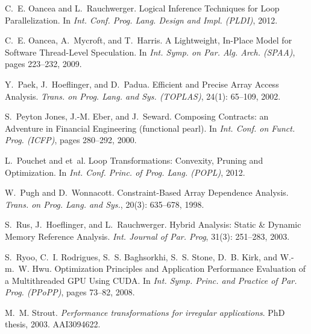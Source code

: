 \documentclass{sigplanconf}  %
\begin{document}
\begin{thebibliography}{49}
C.~E. Oancea and L.~Rauchwerger.
\newblock Logical {I}nference {T}echniques for {L}oop {P}arallelization.
\newblock In \emph{Int. Conf. Prog. Lang. Design and Impl. (PLDI)}, 2012.

C.~E. Oancea, A.~Mycroft, and T.~Harris.
\newblock A {L}ightweight, {I}n-{P}lace {M}odel for {S}oftware {T}hread-{L}evel
  {S}peculation.
\newblock In \emph{Int. Symp. on Par. Alg. Arch. (SPAA)}, pages 223--232, 2009.

Y.~Paek, J.~Hoeflinger, and D.~Padua.
\newblock Efficient and {P}recise {A}rray {A}ccess {A}nalysis.
\newblock \emph{Trans. on Prog. Lang. and Sys. (TOPLAS)}, 24(1):
  65--109, 2002.

S.~{Peyton Jones}, J.-M. Eber, and J.~Seward.
\newblock Composing {C}ontracts: an {A}dventure in {F}inancial {E}ngineering
  (functional pearl).
\newblock In \emph{Int. Conf. on Funct. Prog. (ICFP)}, pages 280--292, 2000.

L.~Pouchet and et~al.
\newblock Loop {T}ransformations: {C}onvexity, {P}runing and {O}ptimization.
\newblock In \emph{Int. Conf. Princ. of Prog. Lang. (POPL)}, 2012.

W.~Pugh and D.~Wonnacott.
\newblock Constraint-{B}ased {A}rray {D}ependence {A}nalysis.
\newblock \emph{Trans. on Prog. Lang. and Sys.}, 20(3): 635--678,
  1998.

S.~Rus, J.~Hoeflinger, and L.~Rauchwerger.
\newblock Hybrid {A}nalysis: {S}tatic \& {D}ynamic {M}emory {R}eference
  {A}nalysis.
\newblock \emph{Int. Journal of Par. Prog}, 31(3): 251--283, 2003.

S.~Ryoo, C.~I. Rodrigues, S.~S. Baghsorkhi, S.~S. Stone, D.~B. Kirk, and
  W.-m.~W. Hwu.
\newblock Optimization {P}rinciples and {A}pplication {P}erformance
  {E}valuation of a {M}ultithreaded {GPU} {U}sing {CUDA}.
\newblock In \emph{Int. Symp. Princ. and Practice of Par. Prog. (PPoPP)}, pages
  73--82, 2008.

M.~M. Strout.
\newblock \emph{Performance transformations for irregular applications}.
\newblock PhD thesis, 2003.
\newblock AAI3094622.


\end{thebibliography}
\end{document}
